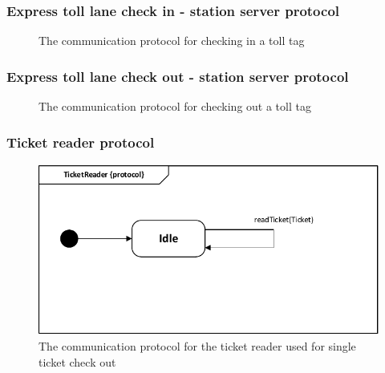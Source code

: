 \subsubsection*{Express toll lane check in - station server protocol}
\begin{figure}[H]
\centering
\caption{The communication protocol for checking in a toll tag}
\label{fig:protocol_state_machine_station_server with_toll_computer_check_in}
\end{figure}

\subsubsection*{Express toll lane check out - station server protocol}
\begin{figure}[H]
\centering
\caption{The communication protocol for checking out a toll tag}
\label{fig:protocol_state_machine_station_server with_toll_computer_check_out}
\end{figure}

\subsubsection*{Ticket reader protocol}
\begin{figure}[H]
\centering
\includegraphics[width=0.7\linewidth]{img/behaviour_state_machines/protocol_state_machines/protocol_state_machine_ticket_reader}
\caption{The communication protocol for the ticket reader used for single ticket check out}
\label{fig:protocol_state_machine_ticket_reader}
\end{figure}

